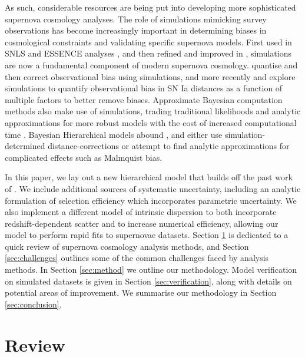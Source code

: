 \documentclass[a4paper,fleqn,usenatbib]{mnras}
\newcommand{\green}{\color{forestgreen}}
\begin{document}
As such, {\green considerable resources are} being put into developing more sophisticated supernova cosmology analyses. The role of simulations mimicking survey observations has become increasingly important in determining biases in cosmological constraints and validating specific supernova models. First used in SNLS \citep{Astier2006} and ESSENCE analyses \citep{Wood-Vasey2007}, and then refined and improved in \citet{Kessler2009}, simulations are now a fundamental component of modern supernova cosmology.  \citet{Betoule2014} quantise and then correct observational bias using simulations, and more recently \citet{Scolnic2016} and \citet{Kessler2017} explore simulations to quantify observational bias in SN Ia distances as a function of {\green multiple} factors to better remove biases. Approximate Bayesian computation methods also make use of simulations, trading traditional likelihoods and analytic approximations for more robust models with the cost of increased computational time \citep{Weyant2013, Jennings2016}. Bayesian Hierarchical models abound \citep{Mandel2009, March2011, March2014, Rubin2015, Shariff2016, Roberts2017}, {\green and either use simulation-determined distance-corrections} or attempt to find analytic approximations for complicated effects such as Malmquist bias.



{\green In this paper, we lay out a new hierarchical model that builds off the past work of \citet{Rubin2015}. We include additional sources of systematic uncertainty, including an analytic formulation of selection efficiency which incorporates parametric uncertainty. We also implement a different model of intrinsic dispersion to both incorporate redshift-dependent scatter and to increase numerical efficiency, allowing our model to perform rapid fits to supernovae datasets.} Section \ref{sec:review} is dedicated to a quick review of {\green supernova cosmology analysis methods}, and Section \ref{sec:challenges} outlines some of the common challenges faced by analysis methods. In Section \ref{sec:method} we outline our methodology. Model verification on simulated datasets is given in Section \ref{sec:verification}, along with details on potential areas of improvement. We summarise our methodology in Section \ref{sec:conclusion}.



\section{Review}
\label{sec:review}
\end{document}

